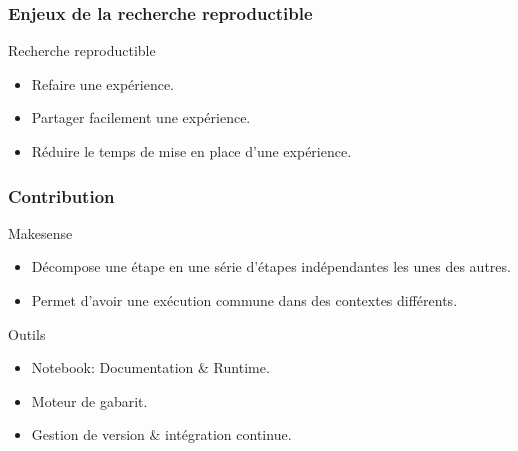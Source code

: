\begin{frame}\frametitle{Enjeux de la recherche reproductible}

  \begin{block}{Recherche reproductible}
    \begin{itemize}
      \item Refaire une expérience.
      \item Partager facilement une expérience.
      \item Réduire le temps de mise en place d'une expérience.
    \end{itemize}
  \end{block}


\end{frame}

\begin{frame}\frametitle{Contribution}

  \begin{alertblock}{Makesense}
    \begin{itemize}
      \item Décompose une étape en une série d'étapes indépendantes les unes des autres.
      \item Permet d'avoir une exécution commune dans des contextes différents.
    \end{itemize}
  \end{alertblock}

  \begin{alertblock}{Outils}
    \begin{itemize}
      \item Notebook: Documentation \& Runtime.
      \item Moteur de gabarit.
      \item Gestion de version \& intégration continue.
    \end{itemize}
  \end{alertblock}

\end{frame}



